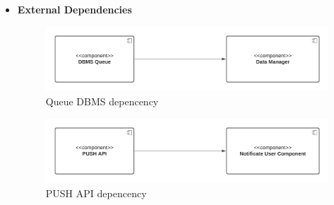 \begin{itemize}
    \item \textbf{External Dependencies}
    \begin{figure}[h!]
        \centering
        \includegraphics[width=.8\textwidth]{Images/TestDiagram/Queue/ExternalDepDBMS.png}
        \caption{\label{fig:QueueExternalDepDBMS}{Queue DBMS depencency}}
    \end{figure}
    \FloatBarrier  
    
    \begin{figure}[h!]
        \centering
        \includegraphics[width=.8\textwidth]{Images/TestDiagram/Queue/ExternalDepPUSH.png}
        \caption{\label{fig:QueueExternalDepPUSH}{PUSH API depencency}}
    \end{figure}
    \FloatBarrier  
    

\end{itemize}
